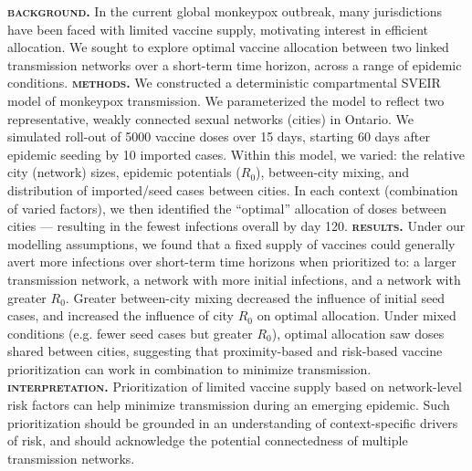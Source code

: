 \renewcommand{\emph}[1]{\textbf{\textsc{\MakeLowercase{#1}}}}
\emph{Background.}
In the current global monkeypox outbreak,
many jurisdictions have been faced with limited vaccine supply,
motivating interest in efficient allocation.
We sought to explore optimal vaccine allocation between two linked transmission networks
over a short-term time horizon, across a range of epidemic conditions.
\emph{Methods.}
We constructed a deterministic compartmental SVEIR model of monkeypox transmission.
We parameterized the model to reflect
two representative, weakly connected \GBMSM sexual networks (cities) in Ontario.
We simulated roll-out of 5000 vaccine doses over 15 days,
starting 60 days after epidemic seeding by 10 imported cases.
Within this model, we varied:
the relative city (network) sizes,
epidemic potentials ($R_0$),
between-city mixing,
and distribution of imported/seed cases between cities.
In each context (combination of varied factors),
we then identified the ``optimal'' allocation of doses between cities
--- resulting in the fewest infections overall by day 120.
\emph{Results.}
Under our modelling assumptions, we found that a fixed supply of vaccines
could generally avert more infections over short-term time horizons when prioritized to:
a larger transmission network,
a network with more initial infections, and
a network with greater $R_0$.
Greater between-city mixing decreased the influence of initial seed cases, and
increased the influence of city $R_0$ on optimal allocation.
Under mixed conditions (e.g. fewer seed cases but greater $R_0$),
optimal allocation saw doses shared between cities,
suggesting that proximity-based and risk-based vaccine prioritization
can work in combination to minimize transmission.
\emph{Interpretation.}
Prioritization of limited vaccine supply based on network-level risk factors
can help minimize transmission during an emerging epidemic.
Such prioritization should be grounded in an understanding of context-specific drivers of risk,
and should acknowledge the potential connectedness of multiple transmission networks.
